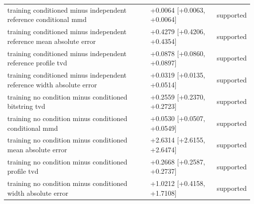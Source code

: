 \begin{table}[p]
\begin{tabular}{@{}p{}p{}p{}@{}}
training conditioned minus independent reference conditional mmd & +0.0064 [+0.0063, +0.0064] & supported \\
training conditioned minus independent reference mean absolute error & +0.4279 [+0.4206, +0.4354] & supported \\
training conditioned minus independent reference profile tvd & +0.0878 [+0.0860, +0.0897] & supported \\
training conditioned minus independent reference width absolute error & +0.0319 [+0.0135, +0.0514] & supported \\
training no condition minus conditioned bitstring tvd & +0.2559 [+0.2370, +0.2723] & supported \\
training no condition minus conditioned conditional mmd & +0.0530 [+0.0507, +0.0549] & supported \\
training no condition minus conditioned mean absolute error & +2.6314 [+2.6155, +2.6474] & supported \\
training no condition minus conditioned profile tvd & +0.2668 [+0.2587, +0.2737] & supported \\
training no condition minus conditioned width absolute error & +1.0212 [+0.4158, +1.7108] & supported \\
\bottomrule
\end{tabular}
\end{table}
\clearpage
